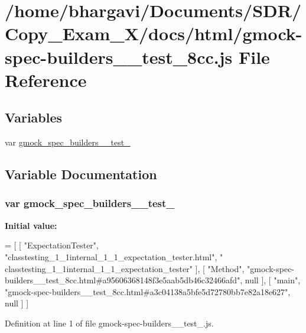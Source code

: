 \hypertarget{gmock-spec-builders____test__8cc_8js}{}\section{/home/bhargavi/\+Documents/\+S\+D\+R/\+Copy\+\_\+\+Exam\+\_\+X/docs/html/gmock-\/spec-\/builders\+\_\+\+\_\+test\+\_\+8cc.js File Reference}
\label{gmock-spec-builders____test__8cc_8js}
\subsection*{Variables}
\begin{DoxyCompactItemize}
\item 
var \hyperlink{gmock-spec-builders____test__8cc_8js_a22842c1c98f95f4febc68ae714dad1b7}{gmock\+\_\+spec\+\_\+builders\+\_\+\+\_\+test\+\_}
\end{DoxyCompactItemize}


\subsection{Variable Documentation}
\subsubsection[{\texorpdfstring{gmock\+\_\+spec\+\_\+builders\+\_\+\+\_\+test\+\_\+8cc}{gmock_spec_builders__test_8cc}}]{\setlength{\rightskip}{0pt plus 5cm}var gmock\+\_\+spec\+\_\+builders\+\_\+\+\_\+test\+\_}\hypertarget{gmock-spec-builders____test__8cc_8js_a22842c1c98f95f4febc68ae714dad1b7}{}\label{gmock-spec-builders____test__8cc_8js_a22842c1c98f95f4febc68ae714dad1b7}
{\bfseries Initial value\+:}
\begin{DoxyCode}
=
[
    [ \textcolor{stringliteral}{"ExpectationTester"}, \textcolor{stringliteral}{"classtesting\_1\_1internal\_1\_1\_expectation\_tester.html"}, \textcolor{stringliteral}{"
      classtesting\_1\_1internal\_1\_1\_expectation\_tester"} ],
    [ \textcolor{stringliteral}{"Method"}, \textcolor{stringliteral}{"gmock-spec-builders\_\_test\_8cc.html#a95606368148f3e5aab5db46c32466afd"}, null ],
    [ \textcolor{stringliteral}{"main"}, \textcolor{stringliteral}{"gmock-spec-builders\_\_test\_8cc.html#a3c04138a5bfe5d72780bb7e82a18e627"}, null ]
]
\end{DoxyCode}


Definition at line 1 of file gmock-\/spec-\/builders\+\_\+\+\_\+test\+\_.\+js.

